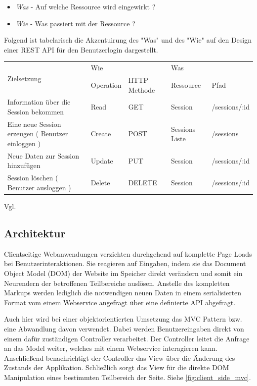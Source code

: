 \begin{itemize}
 \item \emph{Was} - Auf welche Ressource wird eingewirkt ?
 \item \emph{Wie} - Was passiert mit der Ressource ?
\end{itemize}
 
Folgend ist tabelarisch die Akzentuirung des "Was" und des "Wie" auf den Design einer REST API für den Benutzerlogin dargestellt.

\begin{center}
    \begin{tabular}{ | p{5cm} | l | l | l | l |}
    \hline
    \multirow{2}{*}{Zielsetzung} & \multicolumn{2}{l|}{ Wie } & \multicolumn{2}{l|}{ Was } \\ \cline{2-5} 
    & Operation & HTTP Methode & Ressource & Pfad \\ \hline
    Information über die Session  bekommen & Read & GET & Session & /sessions/:id \\ \hline
    Eine neue Session erzeugen ( Benutzer einloggen ) & Create & POST & Sessions Liste & /sessions \\ \hline
    Neue Daten zur Session hinzufügen & Update & PUT & Session & /sessions/:id \\ \hline
    Session löschen ( Benutzer ausloggen ) & Delete & DELETE & Session & /sessions/:id \\ \hline  
    \end{tabular}
\end{center}

Vgl. \cite[Kap. REST and CRUD]{LaunchSchool:2016}

\subsection{Architektur}

Clientseitige Webanwendungen verzichten durchgehend auf komplette Page Loads bei Benutzerinteraktionen. Sie reagieren auf Eingaben, indem sie das Document Object Model (DOM) der Website im Speicher direkt verändern und somit ein Neurendern der betroffenen Teilbereiche auslösen. Anstelle des kompletten Markups werden lediglich die notwendigen neuen Daten in einem serialisierten Format vom einem Webservice angefragt über eine definierte API abgefragt. 

Auch hier wird bei einer objektorientierten Umsetzung das MVC Pattern bzw. eine Abwandlung davon verwendet. Dabei werden Benutzereingaben direkt von einem dafür zuständigen Controller verarbeitet. Der Controller leitet die Anfrage an das Model weiter, welches mit einem Webservice interagieren kann. Anschließend benachrichtigt der Controller das View über die Änderung des Zustands der Applikation. Schließlich sorgt das View für die direkte DOM Manipulation eines bestimmten Teilbereich der Seite.
Siehe \ref{fig:client_side_mvc}.

